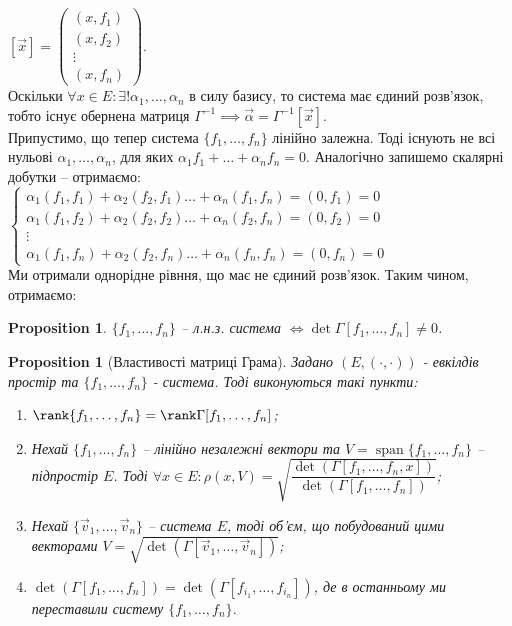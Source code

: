 \documentclass[a4paper, 10pt]{article}
\theoremstyle{theoremdd}
\newtheorem{proposition}[theorem]{Proposition}
\DeclareMathOperator{\linspan}{span}
\begin{document}
$[\vec{x}] = \begin{pmatrix}
(x,f_1) \\ (x,f_2) \\ \vdots \\ (x,f_n)
\end{pmatrix}$.\\
Оскільки $\forall x \in E: \exists! \alpha_1,\dots,\alpha_n$ в силу базису, то система має єдиний розв'язок, тобто існує обернена матриця $\Gamma^{-1} \implies \vec{\alpha} = \Gamma^{-1} [\vec{x}]$.
\bigskip \\
Припустимо, що тепер система $\{f_1,\dots,f_n\}$ лінійно залежна. Тоді існують не всі нульові $\alpha_1,\dots,\alpha_n$, для яких $\alpha_1 f_1 + \dots + \alpha_n f_n = 0$. Аналогічно запишемо скалярні добутки -- отримаємо:\\
$\begin{cases}
\alpha_1 (f_1,f_1) + \alpha_2 (f_2,f_1) \dots + \alpha_n (f_1,f_n) = (0,f_1) = 0 \\
\alpha_1 (f_1,f_2) + \alpha_2 (f_2,f_2) \dots + \alpha_n (f_2,f_n) = (0,f_2) = 0 \\
\vdots \\
\alpha_1 (f_1,f_n) + \alpha_2 (f_2,f_n) \dots + \alpha_n (f_n,f_n) = (0,f_n) = 0
\end{cases}$\\
Ми отримали однорідне рівння, що має не єдиний розв'язок. Таким чином, отримаємо:
\begin{proposition}
$\{f_1,\dots,f_n\}$ -- л.н.з. система $\iff \det \Gamma[f_1,\dots,f_n] \neq 0$.
\end{proposition}

\begin{proposition}[Властивості матриці Грама]
Задано $(E,(\cdot,\cdot))$ - евкілдів простір та $\{f_1,\dots,f_n\}$ - система. Тоді виконуються такі пункти:
\begin{enumerate}[nosep, wide=0pt, label={\arabic*)}]
\item $\rank \{f_1,\dots,f_n\} = \rank \Gamma [f_1,\dots,f_n]$;
\item Нехай $\{f_1,\dots,f_n\}$ -- лінійно незалежні вектори та $V = \linspan\{f_1,\dots,f_n\}$ -- підпростір $E$. Тоді $\forall x \in E: \rho(x,V) = \sqrt{\dfrac{\det(\Gamma[f_1,\dots,f_n,x])}{\det(\Gamma[f_1,\dots,f_n])}}$;
\item Нехай $\{\vec{v}_1,\dots,\vec{v}_n\}$ -- система $E$, тоді об'єм, що побудований цими векторами $V = \sqrt{\det(\Gamma[\vec{v}_1,\dots,\vec{v}_n])}$;
\item $\det(\Gamma[f_1,\dots,f_n]) = \det(\Gamma[f_{i_1},\dots,f_{i_n}])$, де в останньому ми переставили систему $\{f_1,\dots,f_n\}$.
\end{enumerate}
\end{proposition}
\end{document}
